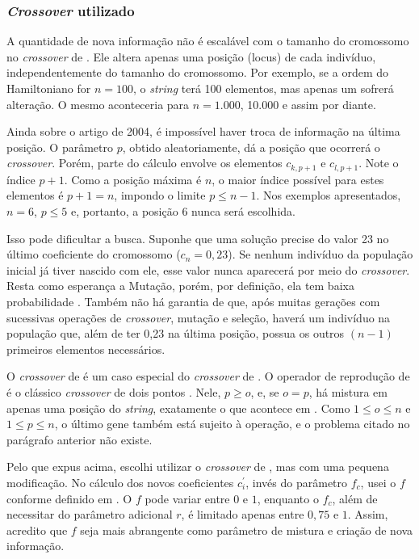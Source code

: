 	
\subsubsection{\emph{Crossover} utilizado}
\label{sec:crossover_utilizado}

	A quantidade de nova informação não é escalável com o tamanho do cromossomo no \emph{crossover} de \cite{metodo2004}. Ele altera apenas uma posição (locus) de cada indivíduo, independentemente do tamanho do cromossomo. Por exemplo, se a ordem do Hamiltoniano for $n = 100$, o \emph{string} terá 100 elementos, mas apenas um sofrerá alteração. O mesmo aconteceria para $n = 1.000$, 10.000 e assim por diante.
	
	Ainda sobre o artigo de 2004, é impossível haver troca de informação na última posição. O parâmetro $p$, obtido aleatoriamente, dá a posição que ocorrerá o \emph{crossover}. Porém, parte do cálculo envolve os elementos $c_{k,p+1}$ e $c_{l,p+1}$. Note o índice $p+1$. Como a posição máxima é $n$, o maior índice possível para estes elementos é $p + 1 = n$, impondo o limite $p \leq n - 1$. Nos exemplos apresentados, $n = 6$, $p \leq 5$ e, portanto, a posição $6$ nunca será escolhida.
	
	Isso pode dificultar a busca. Suponhe que uma solução precise do valor 23 no último coeficiente do cromossomo ($c_n = 0,23$). Se nenhum indivíduo da população inicial já tiver nascido com ele, esse valor nunca aparecerá por meio do \emph{crossover}. Resta como esperança a Mutação, porém, por definição, ela tem baixa probabilidade \cite{Linden2008}. Também não há garantia de que, após muitas gerações com sucessivas operações de \emph{crossover}, mutação e seleção, haverá um indivíduo na população que, além de ter 0,23 na última posição, possua os outros $(n-1)$ primeiros elementos necessários.
		
		O \emph{crossover} de \cite{metodo2004} é um caso especial do \emph{crossover} de \cite{metodo2011}. O operador de reprodução de \cite{metodo2011} é o clássico \emph{crossover} de dois pontos \cite{Linden2008}. Nele, $p \geq o$, e, se $o = p$, há mistura em apenas uma posição do \emph{string}, exatamente o que acontece em \cite{metodo2004}. Como $1 \leq o \leq n$ e $1 \leq p \leq n$, o último gene também está sujeito à operação, e o problema citado no parágrafo anterior não existe.
		
	Pelo que expus acima, escolhi utilizar o \emph{crossover} de \cite{metodo2011}, mas com uma pequena modificação. No cálculo dos novos coeficientes $c^{'}_{i}$, invés do parâmetro $f_c$, usei o $f$ conforme definido em \cite{metodo2004}. O $f$ pode variar entre $0$ e $1$, enquanto o $f_c$, além de necessitar do parâmetro adicional $r$, é limitado apenas entre $0,75$ e $1$. Assim, acredito que $f$ seja mais abrangente como parâmetro de mistura e criação de nova informação.
	
